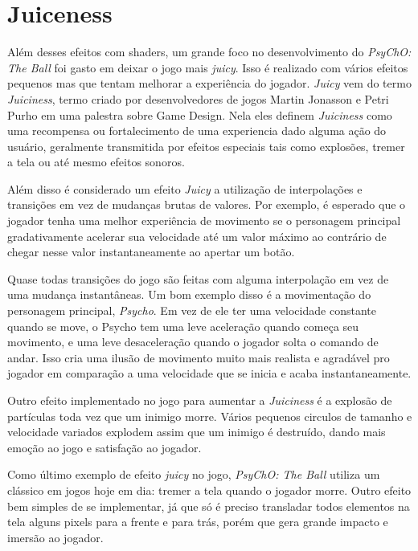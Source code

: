 \section{Juiceness}
\label{sec:juiceness}

Além desses efeitos com shaders, um grande foco no desenvolvimento do \textit{PsyChO: The Ball} foi gasto em deixar o jogo mais \textit{juicy}. Isso é realizado com vários efeitos pequenos mas que tentam melhorar a experiência do jogador. \textit{Juicy} vem do termo \textit{Juiciness}, termo criado por desenvolvedores de jogos Martin Jonasson e Petri Purho em uma palestra sobre Game Design\cite{martinpetri}. Nela eles definem \textit{Juiciness} como uma recompensa ou fortalecimento de uma experiencia dado alguma ação do usuário, geralmente transmitida por efeitos especiais tais como explosões, tremer a tela ou até mesmo efeitos sonoros.

Além disso é considerado um efeito \textit{Juicy} a utilização de interpolações e transições em vez de mudanças brutas de valores. Por exemplo, é esperado que o jogador tenha uma melhor experiência de movimento se o personagem principal gradativamente acelerar sua velocidade até um valor máximo ao contrário de chegar nesse valor instantaneamente ao apertar um botão.

Quase todas transições do jogo são feitas com alguma interpolação em vez de uma mudança instantâneas. Um bom exemplo disso é a movimentação do personagem principal, \textit{Psycho}. Em vez de ele ter uma velocidade constante quando se move, o Psycho tem uma leve aceleração quando começa seu movimento, e uma leve desaceleração quando o jogador solta o comando de andar. Isso cria uma ilusão de movimento muito mais realista e agradável pro jogador em comparação a uma velocidade que se inicia e acaba instantaneamente.

Outro efeito implementado no jogo para aumentar a \textit{Juiciness} é a explosão de partículas toda vez que um inimigo morre. Vários pequenos circulos de tamanho e velocidade variados explodem assim que um inimigo é destruído, dando mais emoção ao jogo e satisfação ao jogador.

Como último exemplo de efeito \textit{juicy} no jogo, \textit{PsyChO: The Ball} utiliza um clássico em jogos hoje em dia: tremer a tela quando o jogador morre. Outro efeito bem simples de se implementar, já que só é preciso transladar todos elementos na tela alguns pixels para a frente e para trás, porém que gera grande impacto e imersão ao jogador.

